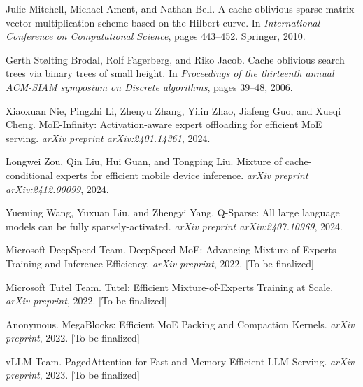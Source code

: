 \documentclass{article}
\numberwithin{equation}{section}
\theoremstyle{plain}
\theoremstyle{definition}
\theoremstyle{remark}
\begin{document}
\begin{thebibliography}{99}
Julie Mitchell, Michael Ament, and Nathan Bell.
\newblock A cache-oblivious sparse matrix-vector multiplication scheme based on the Hilbert curve.
\newblock In \emph{International Conference on Computational Science}, pages 443--452. Springer, 2010.

Gerth Stølting Brodal, Rolf Fagerberg, and Riko Jacob.
\newblock Cache oblivious search trees via binary trees of small height.
\newblock In \emph{Proceedings of the thirteenth annual ACM-SIAM symposium on Discrete algorithms}, pages 39--48, 2006.

Xiaoxuan Nie, Pingzhi Li, Zhenyu Zhang, Yilin Zhao, Jiafeng Guo, and Xueqi Cheng.
\newblock MoE-Infinity: Activation-aware expert offloading for efficient MoE serving.
\newblock \emph{arXiv preprint arXiv:2401.14361}, 2024.

Longwei Zou, Qin Liu, Hui Guan, and Tongping Liu.
\newblock Mixture of cache-conditional experts for efficient mobile device inference.
\newblock \emph{arXiv preprint arXiv:2412.00099}, 2024.

Yueming Wang, Yuxuan Liu, and Zhengyi Yang.
\newblock Q-Sparse: All large language models can be fully sparsely-activated.
\newblock \emph{arXiv preprint arXiv:2407.10969}, 2024.

Microsoft DeepSpeed Team.
\newblock DeepSpeed-MoE: Advancing Mixture-of-Experts Training and Inference Efficiency.
\newblock \emph{arXiv preprint}, 2022. [To be finalized]

Microsoft Tutel Team.
\newblock Tutel: Efficient Mixture-of-Experts Training at Scale.
\newblock \emph{arXiv preprint}, 2022. [To be finalized]

Anonymous.
\newblock MegaBlocks: Efficient MoE Packing and Compaction Kernels.
\newblock \emph{arXiv preprint}, 2022. [To be finalized]

vLLM Team.
\newblock PagedAttention for Fast and Memory-Efficient LLM Serving.
\newblock \emph{arXiv preprint}, 2023. [To be finalized]

\end{thebibliography}
\end{document}

